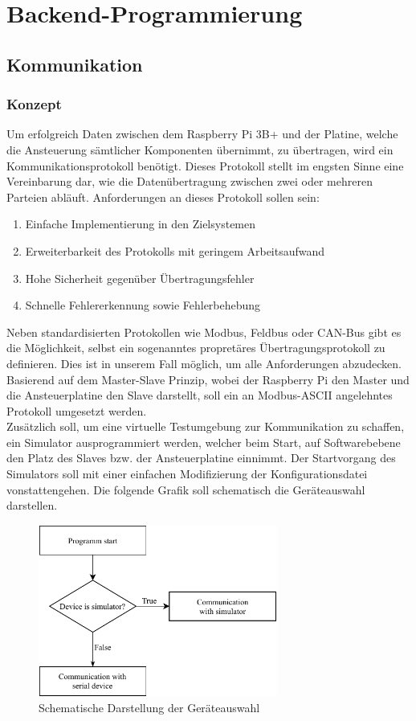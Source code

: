 \section{Backend-Programmierung}\label{sec:backend-programmierung}
\subsection{Kommunikation}\label{subsec:kommunikation}
\subsubsection{Konzept}
Um erfolgreich Daten zwischen dem Raspberry Pi 3B+ und der Platine, welche die Ansteuerung sämtlicher Komponenten übernimmt, zu übertragen, wird ein Kommunikationsprotokoll benötigt.
Dieses Protokoll stellt im engsten Sinne eine Vereinbarung dar, wie die Datenübertragung zwischen zwei oder mehreren Parteien abläuft.
Anforderungen an dieses Protokoll sollen sein:
\begin{enumerate}
    \item Einfache Implementierung in den Zielsystemen
    \item Erweiterbarkeit des Protokolls mit geringem Arbeitsaufwand
    \item Hohe Sicherheit gegenüber Übertragungsfehler
    \item Schnelle Fehlererkennung sowie Fehlerbehebung
\end{enumerate}
Neben standardisierten Protokollen wie Modbus, Feldbus oder CAN-Bus gibt es die Möglichkeit, selbst ein sogenanntes propretäres Übertragungsprotokoll zu definieren.
Dies ist in unserem Fall möglich, um alle Anforderungen abzudecken.
Basierend auf dem Master-Slave Prinzip, wobei der Raspberry Pi den Master und die Ansteuerplatine den Slave darstellt, soll ein an Modbus-\acs{ASCII} angelehntes Protokoll umgesetzt werden.\\
Zusätzlich soll, um eine virtuelle Testumgebung zur Kommunikation zu schaffen, ein Simulator ausprogrammiert werden, welcher beim Start, auf Softwarebebene den Platz des Slaves bzw. der Ansteuerplatine einnimmt.
Der Startvorgang des Simulators soll mit einer einfachen Modifizierung der Konfigurationsdatei vonstattengehen.
Die folgende Grafik soll schematisch die Geräteauswahl darstellen.
\begin{figure}[H]
    \centering
    \includegraphics[width=0.7\textwidth]{fig/ainf/DeviceSelection}
    \caption{Schematische Darstellung der Geräteauswahl}
    \label{deviceSelection}
\end{figure}
